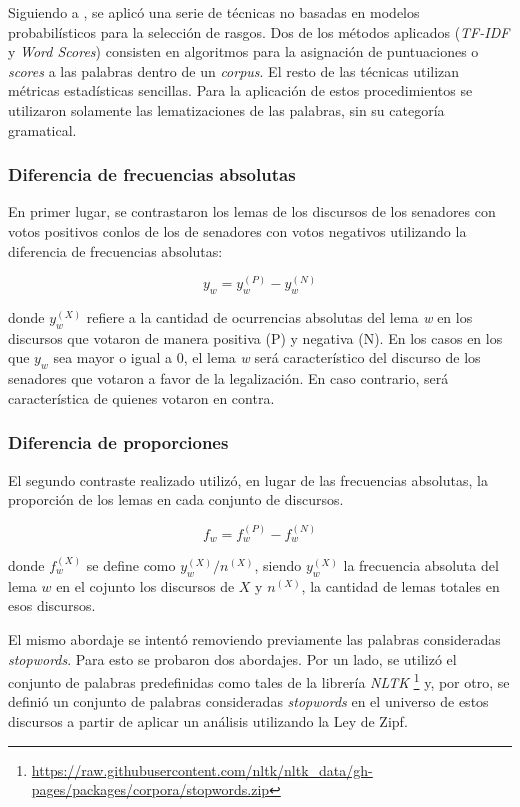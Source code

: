 Siguiendo a \cite{monroe2008fightin}, se aplic\'o una serie de t\'ecnicas
no basadas en modelos probabil\'isticos para la selecci\'on de rasgos.
Dos de los m\'etodos aplicados (\textit{TF-IDF} y \textit{Word Scores}) consisten
en algoritmos para la asignaci\'on de puntuaciones o \textit{scores} a las
palabras dentro de un \textit{corpus}. El resto de las t\'ecnicas utilizan
m\'etricas estad\'isticas sencillas. Para la aplicación de estos procedimientos
se utilizaron solamente las lematizaciones de las palabras, sin su categoría
gramatical.

\subsubsection{Diferencia de frecuencias absolutas}
En primer lugar, se contrastaron los lemas de los discursos de los
senadores con votos positivos conlos de los de senadores con votos negativos
utilizando la diferencia de frecuencias absolutas:

\begin{equation}
y_w = y_{w}^{(P)}-y_{w}^{(N)}
\end{equation}

donde $y_{w}^{(X)}$ refiere a la cantidad de ocurrencias absolutas del lema
\textit{w} en los discursos que votaron de manera positiva (P) y negativa (N).
En los casos en los que $y_{w}$ sea mayor o igual a $0$, el lema \textit{w}
ser\'a caracter\'istico del discurso de los senadores que votaron a favor de
la legalizaci\'on. En caso contrario, ser\'a caracter\'istica de quienes votaron
en contra.

\subsubsection{Diferencia de proporciones}
El segundo contraste realizado utiliz\'o, en lugar de las frecuencias absolutas,
la proporci\'on de los lemas en cada conjunto de discursos.

\begin{equation}
    f_w = f_{w}^{(P)}-f_{w}^{(N)}
\end{equation}


donde $f_{w}^{(X)}$ se define como $y_{w}^{(X)} / n^{(X)}$, siendo $y_{w}^{(X)}$
la frecuencia absoluta del lema $w$ en el cojunto los discursos de $X$
y $n^{(X)}$, la cantidad de lemas totales en esos discursos.

El mismo abordaje se intent\'o removiendo previamente las palabras consideradas
\textit{stopwords}. Para esto se probaron dos abordajes. Por un lado, se
utiliz\'o el conjunto de palabras predefinidas como tales de la librer\'ia \textit{NLTK}
\footnote{\url{https://raw.githubusercontent.com/nltk/nltk_data/gh-pages/packages/corpora/stopwords.zip}}
y, por otro, se definió un conjunto de palabras consideradas \textit{stopwords}
en el universo de estos discursos a partir de aplicar un análisis utilizando la
Ley de Zipf.

